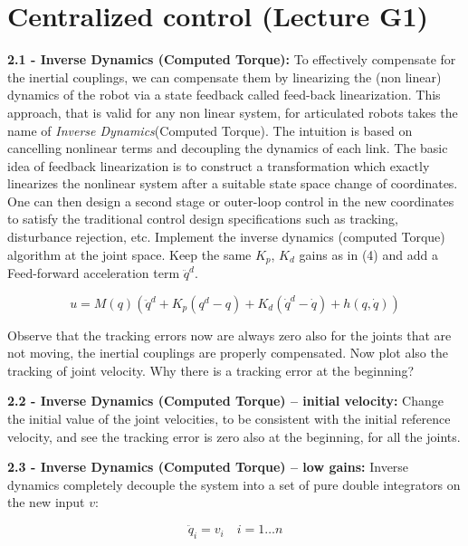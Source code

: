 \documentclass[11pt]{article}
\begin{document}
\quad

\section{Centralized control (Lecture G1)}

\noindent
\textbf{2.1 - Inverse Dynamics (Computed Torque):}
To effectively compensate for the inertial couplings, we can compensate them by linearizing the (non linear) dynamics of the robot via a state feedback called feed-back linearization. This approach, that is valid for any non linear system, for articulated robots takes the name of \textit{Inverse Dynamics}(Computed Torque). The intuition is based on cancelling nonlinear terms and decoupling the dynamics of each link.
The basic idea of feedback linearization is to construct a transformation which exactly linearizes the
nonlinear system after a suitable state space change of coordinates. One can then design a second stage or
outer-loop control in the new coordinates to satisfy the traditional control design specifications such as tracking,
disturbance rejection, etc.
Implement the inverse dynamics  (computed Torque) algorithm at the joint space. Keep the same $K_p$, $K_d$ gains as in (4) and add a Feed-forward acceleration term $\ddot{q}^d$. 

\begin{equation*}
u = M(q) (\ddot{q}^d + K_{p} (q^d  - q) + K_{d} (\dot{q}^d  - \dot{q}) + h(q,\dot{q}))
\end{equation*}

Observe that the tracking errors  now are  always zero also for the joints that are not moving, 
the inertial couplings are properly compensated. 
Now plot also the tracking of joint velocity. Why there is a tracking error at the beginning? 

\quad

\noindent
\textbf{ 2.2 - Inverse Dynamics (Computed Torque) – initial velocity:}
Change the initial value of the joint velocities, to be consistent with the initial reference velocity, and see the tracking error is zero also at the beginning, for all the joints. 

\quad

\noindent
\textbf{ 2.3 - Inverse Dynamics (Computed Torque) – low gains:}
Inverse dynamics completely decouple the system into a set of pure double integrators on the new input $v$:

\begin{equation*}
\ddot{q}_i = v_i  \quad i = 1 \dots n
\end{equation*}
\end{document}
